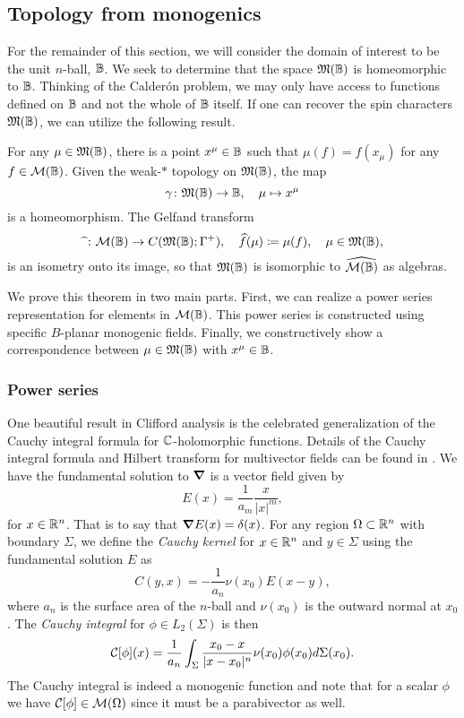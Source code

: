 \subsection{Topology from monogenics}

For the remainder of this section, we will consider the domain of interest to be the unit $n$-ball, $\mathbb{B}$. We seek to determine that the space $\mathfrak{M}(\mathbb{B})$ is homeomorphic to $\mathbb{B}$.  Thinking of the Calder\'on problem, we may only have access to functions defined on $\mathbb{B}$ and not the whole of $\mathbb{B}$ itself.  If one can recover the spin characters $\mathfrak{M}(\mathbb{B})$, we can utilize the following result.

\begin{theorem}
For any $\mu \in \mathfrak{M}(\mathbb{B})$, there is a point $x^\mu \in \mathbb{B}$ such that $\mu(f) = f(x_\mu)$ for any $f\in \mathcal{M}(\mathbb{B})$. Given the weak-$\ast$ topology on $\mathfrak{M}(\mathbb{B})$, the map
\[
\gamma \colon \mathfrak{M}(\mathbb{B}) \to \mathbb{B}, \quad \mu \mapsto x^\mu
\]
is a homeomorphism. The Gelfand transform 
\[
\widehat{~} \colon \mathcal{M}(\mathbb{B}) \to C(\mathfrak{M}(\mathbb{B}); \Gamma^+), \quad \widehat{f}(\mu) \coloneqq \mu(f), \quad \mu \in \mathfrak{M}(\mathbb{B}),
\]
is an isometry onto its image, so that $\mathfrak{M}(\mathbb{B})$ is isomorphic to $\widehat{\mathcal{M}(\mathbb{B})}$ as algebras.
\end{theorem}

We prove this theorem in two main parts. First, we can realize a power series representation for elements in $\mathcal{M}(\mathbb{B})$. This power series is constructed using specific $B$-planar monogenic fields. Finally, we constructively show a correspondence between $\mu \in \mathfrak{M}(\mathbb{B})$ with $x^\mu \in \mathbb{B}$. 

\subsubsection{Power series}

One beautiful result in Clifford analysis is the celebrated generalization of the Cauchy integral formula for $\mathbb{C}$-holomorphic functions. Details of the Cauchy integral formula and Hilbert transform for multivector fields can be found in \cite{brackx_hilbert_2008}. We have the fundamental solution to $\boldsymbol{\nabla}$ is a vector field given by
\[
E(x) = \frac{1}{a_m} \frac{x}{|x|^m},
\]
for $x\in \mathbb{R}^n$. That is to say that $\boldsymbol{\nabla} E(x) = \delta(x)$. For any region $\Omega \subset \mathbb{R}^n$ with boundary $\Sigma$, we define the \emph{Cauchy kernel} for $x\in \mathbb{R}^n$ and $y \in \Sigma$ using the fundamental solution $E$ as
\[
C(y, x) = -\frac{1}{a_n} \nu(x_0) E(x-y),
\]
where $a_n$ is the surface area of the $n$-ball and $\nu(x_0)$ is the outward normal at $x_0$. The \emph{Cauchy integral} for $\phi \in L_2(\Sigma)$ is then
\[
\mathcal{C}[\phi](x) = \frac{1}{a_n} \int_{\Sigma} \frac{x_0-x}{|x-x_0|^n} \nu(x_0) \phi(x_0) d\Sigma(x_0).
\]
The Cauchy integral is indeed a monogenic function and note that for a scalar $\phi$ we have $\mathcal{C}[\phi] \in \mathcal{M}(\Omega)$ since it must be a parabivector as well.

